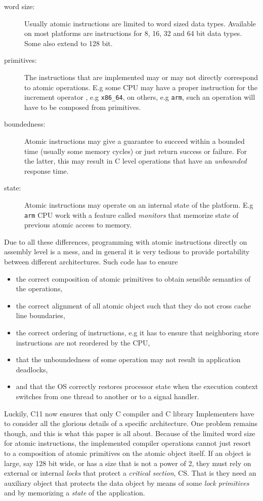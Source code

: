 \iflong
\begin{description}
\item[{word size:}] Usually atomic instructions are limited to word
sized data types. Available on most platforms are
instructions for 8, 16, 32 and 64 bit
data types. Some also extend to 128 bit.\itemadjust
\item[{primitives:}] The instructions that are implemented may or may
not directly correspond to atomic operations. E.g
some CPU may have a proper instruction for the
increment operator \code{++}, e.g \texttt{x86\_64}, on others,
e.g \texttt{arm}, such an operation will have to be
composed from primitives.\itemadjust
\item[{boundedness:}] Atomic instructions may give a guarantee to
succeed within a bounded time (usually some
memory cycles) or just return success or
failure. For the latter, this may result in C
level operations that have an \emph{unbounded}
response time.\itemadjust
\item[{state:}] Atomic instructions may operate on an internal state of
the platform. E.g \texttt{arm} CPU work with a feature called
\emph{monitors} that memorize state of previous atomic
access to memory.\itemadjust
\end{description}

Due to all these differences, programming with atomic instructions
directly on assembly level is a mess, and in general it is very
tedious to provide portability between different
architectures. Such code has to ensure\itemadjust
\begin{itemize}
\item the correct composition of atomic primitives to obtain sensible
semantics of the operations,\itemadjust
\item the correct alignment of all atomic object such that they do not
cross cache line boundaries,\itemadjust
\item the correct ordering of instructions, e.g it has to ensure that
neighboring store instructions are not reordered by the CPU,
\itemadjust
\item that the unboundedness of some operation may not result in
application deadlocks,\itemadjust
\item and that the OS correctly restores processor state when the
execution context switches from one thread to another or to a
signal handler.
\end{itemize}

Luckily, C11 now ensures that only C compiler and C library
Implementers have to consider all the glorious details of a
specific architecture. One problem remains though, and this is what
this paper is all about. Because of the limited word size for
atomic instructions, the implemented compiler operations cannot just
resort to a composition of atomic primitives on the atomic object
itself. If an object is large, say 128 bit wide, or has a size that
is not a power of 2, they must rely on external or internal \emph{locks}
that protect a \emph{critical section}, CS. That is they need an
auxiliary object that protects the data object by means of some
\emph{lock primitives} and by memorizing a \emph{state} of the application.

